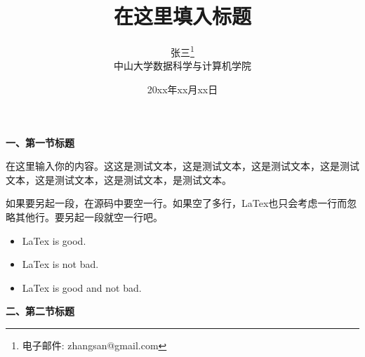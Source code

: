 \documentclass[a4paper, 12pt]{ctexart}
\title{在这里填入标题}
\author{张三\footnote{电子邮件: zhangsan@gmail.com}\\[2ex]
\xiaosihao 中山大学数据科学与计算机学院\\[2ex]
}
\date{20xx年xx月xx日}
\newcommand{\sihao}{\fontsize{14pt}{\baselineskip}\selectfont}
\newcommand{\xiaosihao}{\fontsize{12pt}{\baselineskip}\selectfont}
\begin{document}
\maketitle             %
\setcounter{page}{0}
\thispagestyle{empty}

\newpage               %

\hspace{-2em}\textbf{\sihao 一、第一节标题}

在这里输入你的内容。这这是测试文本，这是测试文本，这是测试文本，这是测试文本，这是测试文本，这是测试文本，是测试文本。

如果要另起一段，在源码中要空一行。如果空了多行，LaTex也只会考虑一行而忽略其他行。要另起一段就空一行吧。

\vspace{-3ex}     %
\begin{itemize}\setlength{\itemindent}{1em}\setlength{\itemsep}{0.3ex}
    \item LaTex is good.
    \item LaTex is not bad.
    \item LaTex is good and not bad.
\end{itemize}

\vspace{2ex}
\hspace{-2em}\textbf{\sihao 二、第二节标题}
\end{document}
